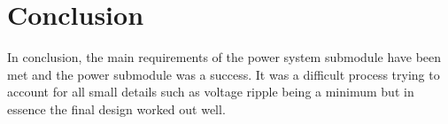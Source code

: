 \documentclass[class=report,11pt,crop=false]{standalone}
\begin{document}
 

\section{Conclusion}

In conclusion, the main requirements of the power system submodule have been met and the power submodule was a success. It was a difficult process trying to account for all small details such as voltage ripple being a minimum but in essence the final design worked out well.

\ifstandalone

\printnoidxglossary[type=\acronymtype,nonumberlist]
\fi
\end{document}
